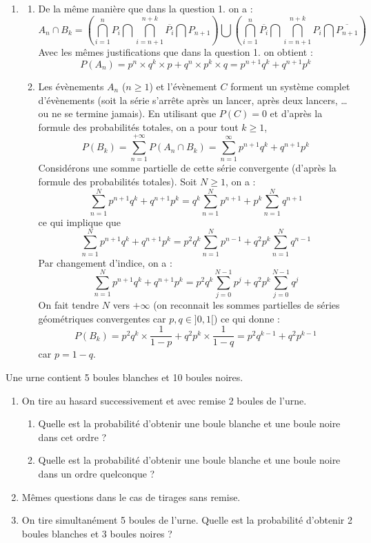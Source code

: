 \documentclass[a4paper,10pt]{report}
\begin{document}
\begin{enumerate}
\item 
\begin{enumerate}
\item De la même manière que dans la question 1. on a :
\[ A_n \cap B_k = \left( \bigcap_{i=1}^n P_i \bigcap \bigcap_{i=n+1}^{n+k} \overline{P_i} \bigcap P_{n+1} \right) \bigcup \left( \bigcap_{i=1}^n \overline{P_i} \bigcap \bigcap_{i=n+1}^{n+k} P_i \bigcap \overline{P_{n+1}} \right) \]
Avec les mêmes justifications que dans la question 1. on obtient :
\[ P(A_n) = p^n \times q^k \times p + q^n \times p^k \times q = p^{n+1} q^k + q^{n+1} p^k \]
\item Les évènements $A_n$ ($n \geq 1$) et l'évènement $C$ forment un système complet d'évènements (soit la série s'arrête après un lancer, après deux lancers, \ldots ou ne se termine jamais). En utilisant que $P(C)=0$ et d'après la formule des probabilités totales, on a pour tout $k \geq 1$,
\[ P(B_k) = \sum_{n=1}^{+ \infty} P(A_n \cap B_k) = \sum_{n=1}^{\infty} p^{n+1} q^k + q^{n+1} p^k \]
Considérons une somme partielle de cette série convergente (d'après la formule des probabilités totales). Soit $N \geq 1$, on a :
\[ \sum_{n=1}^N p^{n+1} q^k +q^{n+1} p^k = q^k \sum_{n=1}^N p^{n+1} + p^k \sum_{n=1}^N q^{n+1} \]
ce qui implique que 
\[ \sum_{n=1}^N p^{n+1} q^k +q^{n+1} p^k = p^2 q^k \sum_{n=1}^N p^{n-1} + q^2p^k \sum_{n=1}^N q^{n-1} \]
Par changement d'indice, on a :
\[ \sum_{n=1}^N p^{n+1} q^k +q^{n+1} p^k = p^2 q^k \sum_{j=0}^{N-1} p^{j} + q^2p^k \sum_{j=0}^{N-1} q^{j} \]
On fait tendre $N$ vers $+\infty$ (on reconnait les sommes partielles de séries géométriques convergentes car $p,q \in ]0,1[$) ce qui donne :
\[ P(B_k) = p^2 q^k \times \frac{1}{1-p} + q^2 p^k \times \frac{1}{1-q} = p^2 q^{k-1} + q^2 p^{k-1} \]
car $p=1-q$.
\end{enumerate}
\end{enumerate}

\begin{Exercice}{} Une urne contient 5 boules blanches et 10 boules noires.

\begin{enumerate}
\item On tire au hasard successivement et avec remise 2 boules de l'urne.
\begin{enumerate}
\item Quelle est la probabilité d'obtenir une boule blanche et une boule noire dans cet ordre ?
\item Quelle est la probabilité d'obtenir une boule blanche et une boule noire dans un ordre quelconque ?
\end{enumerate}
\item Mêmes questions dans le cas de tirages sans remise.
\item On tire simultanément 5 boules de l'urne. Quelle est la probabilité d'obtenir 2 boules blanches et 3 boules noires ?
\end{enumerate}
\end{Exercice}
\end{document}
